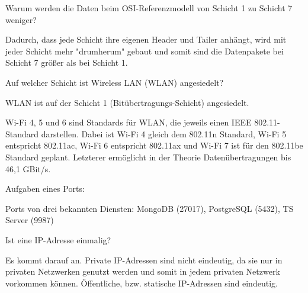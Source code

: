 \documentclass[11pt]{article}
\begin{document}
\begin{aufgabe}
  Warum werden die Daten beim OSI-Referenzmodell von Schicht 1 zu Schicht 7 weniger?

  Dadurch, dass jede Schicht ihre eigenen Header und Tailer anhängt, wird mit jeder Schicht mehr "drumherum" gebaut
  und somit sind die Datenpakete bei Schicht 7 größer als bei Schicht 1.
\end{aufgabe}

\begin{aufgabe}
  Auf welcher Schicht ist Wireless LAN (WLAN) angesiedelt?

  WLAN ist auf der Schicht 1 (Bitübertragungs-Schicht) angesiedelt.

  Wi-Fi 4, 5 und 6 sind Standards für WLAN, die jeweils einen IEEE 802.11-Standard darstellen. Dabei ist Wi-Fi 4 gleich
  dem 802.11n Standard, Wi-Fi 5 entspricht 802.11ac, Wi-Fi 6 entspricht 802.11ax und Wi-Fi 7 ist für den 802.11be Standard
  geplant. Letzterer ermöglicht in der Theorie Datenübertragungen bis 46,1 GBit/s.
\end{aufgabe}

\begin{aufgabe}
  Aufgaben eines Ports:

  Ports von drei bekannten Diensten: MongoDB (27017), PostgreSQL (5432), TS Server (9987)
\end{aufgabe}

\begin{aufgabe}
  Ist eine IP-Adresse einmalig?

  Es kommt darauf an. Private IP-Adressen sind nicht eindeutig, da sie nur in privaten Netzwerken genutzt werden und somit
  in jedem privaten Netzwerk vorkommen können. Öffentliche, bzw. statische IP-Adressen sind eindeutig.
\end{aufgabe}
\end{document}
